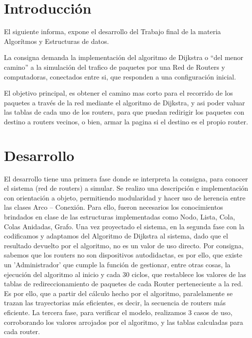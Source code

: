 \documentclass[12pt]{article} %
\begin{document}

\tableofcontents %

\newpage %


\section{Introducción} %

El siguiente informa, expone el desarrollo del Trabajo final de la materia Algorítmos y Estructuras de datos.

La consigna demanda la implementación  del algoritmo de Dijkstra  o  “del menor camino” a la simulación del trafico de  paquetes por una Red de Routers y computadoras, conectados entre si, que responden a una configuración inicial.

El objetivo principal, es obtener  el camino mas corto para el recorrido de los paquetes a través de la red mediante el algoritmo de Dijkstra, y asi poder valuar las tablas de cada uno de los routers, para que puedan redirigir los paquetes con destino a routers vecinos, o bien, armar la pagina si el destino es el propio router.


\section{Desarrollo} %
El desarrollo tiene una primera fase donde se interpreta la consigna, para conocer el sistema (red de routers) a simular. Se realizo una descripción e implementación con orientación a objeto, permitiendo modularidad y hacer uso de herencia entre las clases Arco – Conexión.
Para ello, fueron necesarios los conocimientos brindados en clase de las estructuras implementadas como Nodo, Lista, Cola, Colas Anidadas, Grafo.
Una vez proyectado el sistema, en la segunda fase con la codificamos y adaptamos del  Algoritmo de Dijkstra al sistema, dado que el resultado devuelto por el algoritmo, no es un valor de uso directo.
Por consigna, sabemos que los routers no son dispositivos autodidactas, es por ello, que existe un  ’Administrador’ que  cumple la función de gestionar, entre otras cosas,  la ejecución del algoritmo al inicio y cada 30 ciclos, que restablece los valores de las tablas de redireccionamiento de paquetes de cada Router perteneciente a la red. Es por ello, que a  partir del cálculo hecho por  el algoritmo, paralelamente se trazan las trayectorias más eficientes, es decir, la  secuencia de routers más eficiente.
La tercera fase, para verificar el modelo, realizamos 3 casos de uso, corroborando los valores arrojados por el algoritmo, y las tablas calculadas para cada router.
\end{document}
